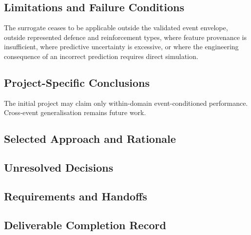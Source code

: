
\subsection{Limitations and Failure Conditions}
\label{sec:res-ml-gen-limitations}

The surrogate ceases to be applicable outside the validated event envelope,
outside represented defence and reinforcement types, where feature provenance is
insufficient, where predictive uncertainty is excessive, or where the
engineering consequence of an incorrect prediction requires direct simulation.

\subsection{Project-Specific Conclusions}
\label{sec:res-ml-gen-conclusions}

The initial project may claim only within-domain event-conditioned performance.
Cross-event generalisation remains future work.

\subsection{Selected Approach and Rationale}
\label{sec:res-ml-gen-selected-approach}


\subsection{Unresolved Decisions}
\label{sec:res-ml-gen-unresolved-decisions}


\subsection{Requirements and Handoffs}
\label{sec:res-ml-gen-requirements}


\subsection{Deliverable Completion Record}
\label{sec:res-ml-gen-completion-record}

%
%
%

